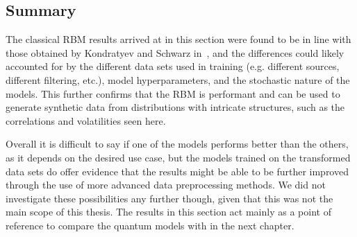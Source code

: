 \subsection{Summary}
The classical RBM results arrived at in this section were found to be in line with those obtained by Kondratyev and Schwarz in~\cite{kondratyev_2019}, and the differences could likely accounted for by the different data sets used in training (e.g. different sources, different filtering, etc.), model hyperparameters, and the stochastic nature of the models.
This further confirms that the RBM is performant and can be used to generate synthetic data from distributions with intricate structures, such as the correlations and volatilities seen here.

Overall it is difficult to say if one of the models performs better than the others, as it depends on the desired use case, but the models trained on the transformed data sets do offer evidence that the results might be able to be further improved through the use of more advanced data preprocessing methods.
We did not investigate these possibilities any further though, given that this was not the main scope of this thesis.
The results in this section act mainly as a point of reference to compare the quantum models with in the next chapter.
